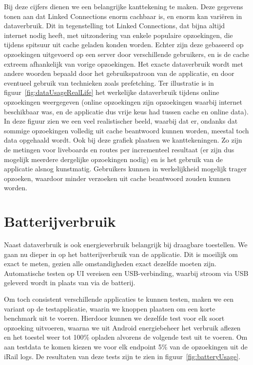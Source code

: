Bij deze cijfers dienen we een belangrijke kanttekening te maken. Deze gegevens tonen aan dat Linked Connections enorm cachbaar is, en enorm kan variëren in dataverbruik. Dit in tegenstelling tot Linked Connections, dat bijna altijd internet nodig heeft, met uitzondering van enkele populaire opzoekingen, die tijdens spitsuur uit cache geladen konden worden. Echter zijn deze gebaseerd op opzoekingen uitgevoerd op een server door verschillende gebruikers, en is de cache extreem afhankelijk van vorige opzoekingen. Het exacte dataverbruik wordt met andere woorden bepaald door het gebruikspatroon van de applicatie, en door eventueel gebruik van technieken zoals prefetching. Ter illustratie is in figuur~\ref{fig:dataUsageRealLife} het werkelijke dataverbruik tijdens online opzoekingen weergegeven (online opzoekingen zijn opzoekingen waarbij internet beschikbaar was, en de applicatie dus vrije keus had tussen cache en online data). In deze figuur zien we een veel realistischer beeld, waarbij dat er, ondanks dat sommige opzoekingen volledig uit cache beantwoord kunnen worden, meestal toch data opgehaald wordt. Ook bij deze grafiek plaatsen we kanttekeningen. Zo zijn de metingen voor liveboards en routes per incrementeel resultaat (er zijn dus mogelijk meerdere dergelijke opzoekingen nodig) en is het gebruik van de applicatie alsnog kunstmatig. Gebruikers kunnen in werkelijkheid mogelijk trager opzoeken, waardoor minder verzoeken uit cache beantwoord zouden kunnen worden.


\section{Batterijverbruik}
Naast dataverbruik is ook energieverbruik belangrijk bij draagbare toestellen. We gaan nu dieper in op het batterijverbruik van de applicatie. Dit is moeilijk om exact te meten, gezien alle omstandigheden exact dezelfde moeten zijn. Automatische testen op UI vereisen een USB-verbinding, waarbij stroom via USB geleverd wordt in plaats van via de batterij. 

Om toch consistent verschillende applicaties te kunnen testen, maken we een variant op de testapplicatie, waarin we knoppen plaatsen om een korte benchmark uit te voeren. Hierdoor kunnen we dezelfde test voor elk soort opzoeking uitvoeren, waarna we uit Android energiebeheer het verbruik aflezen en het toestel weer tot 100\% opladen alvorens de volgende test uit te voeren. Om aan testdata te komen kiezen we voor elk endpoint 5\% van de opzoekingen uit de iRail logs. De resultaten van deze tests zijn te zien in figuur~\ref{fig:batteryUsage}.

